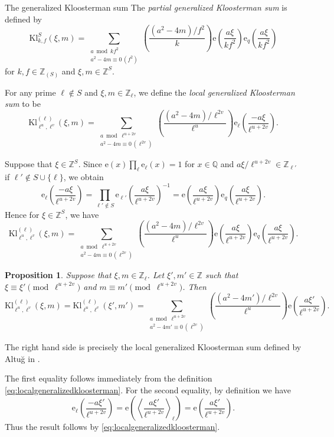 \documentclass[10pt,oneside,reqno]{amsart}
\makeatletter
\newcommand\rme{\mathrm{e}}
\newcommand\QQ{\mathbb{Q}}
\newcommand\ZZ{\mathbb{Z}}
\newcommand\Kl{\mathrm{Kl}}
\newcommand\legendresymbol[2]{\genfrac{(}{)}{}{}{#1}{#2}}
\def\subsection{\@startsection{subsection}{2}
  \z@{3pt\@plus0pt}{-.5em}%
  {\normalfont\bfseries}}
\theoremstyle{THEOREM}
\newtheorem{proposition}[theorem]{Proposition}
\theoremstyle{DEFINITION}
\theoremstyle{EXERCISE}
\numberwithin{equation}{section}
\renewenvironment{proof}[1][\proofname]{\par
  \vspace{-6pt}
  \pushQED{\qed}
  \normalfont \topsep6\p@\@plus6\p@\relax
  \trivlist
  \item[\hskip\labelsep\rmfamily\bfseries
    #1\@addpunct{:}]\ignorespaces
}{
  \popQED\endtrivlist\@endpefalse
  \vspace{-6pt}
}
\makeatother
\begin{document}
\subsection{The generalized Kloosterman sum}\label{subsec:kloosterman}
 The \emph{partial generalized Kloosterman sum} is defined by
\[
\Kl_{k,f}^S(\xi,m)=
  \sum_{\substack{a \bmod kf^2\\ a^2-4m\equiv 0\,(f^2)}}\legendresymbol{(a^2-4m)/f^2}{k}\rme\legendresymbol{a\xi}{kf^2}\rme_{q}\legendresymbol{a\xi}{kf^2}
\]
for $k,f\in \ZZ_{(S)}$ and $\xi,m\in \ZZ^S$. 

For any prime $\ell\notin S$ and $\xi,m\in \ZZ_\ell$, we define the \emph{local generalized Kloosterman sum} to be
\begin{equation}\label{eq:localgeneralizedkloosterman}
\Kl_{\ell^u,\ell^v}^{(\ell)}(\xi,m)=
\sum_{\substack{a \bmod \ell^{u+2v}\\ a^2-4m\equiv 0\,(\ell^{2v})}}\legendresymbol{(a^2-4m)/\ell^{2v}}{\ell^u}\rme_\ell\legendresymbol{-a\xi}{\ell^{u+2v}}.
\end{equation}

Suppose that  $\xi\in \ZZ^S$. Since $\rme(x)\prod_{\ell}\rme_\ell(x)=1$ for $x\in \QQ$ and $a\xi/\ell^{u+2v}\in \ZZ_{\ell'}$ if $\ell'\notin S\cup\{\ell\}$, we obtain
\[
\rme_\ell\legendresymbol{-a\xi}{\ell^{u+2v}}=\prod_{\ell'\notin S}\rme_{\ell'}\legendresymbol{a\xi}{\ell^{u+2v}}^{-1}= \rme\legendresymbol{a\xi}{\ell^{u+2v}}\rme_{q}\legendresymbol{a\xi}{\ell^{u+2v}}.
\]
Hence for $\xi\in \ZZ^S$, we have
\begin{equation}\label{eq:localgeneralizedkloostermaneq}
\Kl_{\ell^u,\ell^v}^{(\ell)}(\xi,m)=
\sum_{\substack{a \bmod \ell^{u+2v}\\ a^2-4m\equiv 0\,(\ell^{2v})}}\legendresymbol{(a^2-4m)/\ell^{2v}}{\ell^u} \rme\legendresymbol{a\xi}{\ell^{u+2v}}\rme_{q}\legendresymbol{a\xi}{\ell^{u+2v}}.
\end{equation}

\begin{proposition}\label{prop:equalkloosterman}
Suppose that $\xi,m\in \ZZ_\ell$. Let $\xi',m'\in \ZZ$ such that $\xi\equiv \xi'\pmod {\ell^{u+2v}}$ and $m\equiv m'\pmod {\ell^{u+2v}}$. Then
\[
\Kl_{\ell^u,\ell^v}^{(\ell)}(\xi,m)=\Kl_{\ell^u,\ell^v}^{(\ell)}(\xi',m')=
                               \sum_{\substack{a \bmod \ell^{u+2v}\\ a^2-4m'\equiv 0\,(\ell^{2v})}}\legendresymbol{(a^2-4m')/\ell^{2v}}{\ell^u} \rme\legendresymbol{a\xi'}{\ell^{u+2v}}.
\]
\end{proposition} 
The right hand side is precisely the local generalized Kloosterman sum defined by Altu\u{g} in \cite{altug2017}.
\begin{proof}
The first equality follows immediately from the definition \eqref{eq:localgeneralizedkloosterman}. For the second equality, by definition we have
\[
\rme_\ell\legendresymbol{-a\xi'}{\ell^{u+2v}}=\rme\left(\left\langle \frac{a\xi'}{\ell^{u+2v}}\right\rangle_{\!\!\ell}\right)=\rme\legendresymbol{a\xi'}{\ell^{u+2v}}.
\]
Thus the result follows by \eqref{eq:localgeneralizedkloosterman}.
\end{proof}
\end{document}
